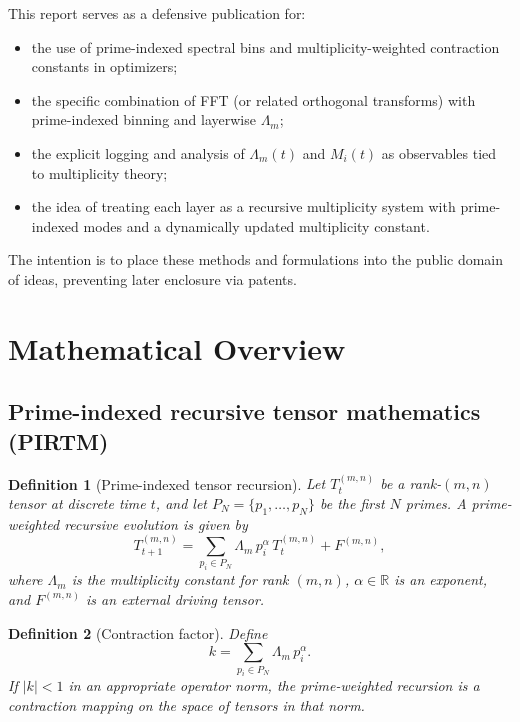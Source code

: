 \documentclass[11pt]{article}
\newtheorem{definition}{Definition}
\begin{document}
This report serves as a defensive publication for:
\begin{itemize}[leftmargin=*]
  \item the use of prime-indexed spectral bins and multiplicity-weighted contraction constants in optimizers;
  \item the specific combination of FFT (or related orthogonal transforms) with prime-indexed binning and layerwise $\Lambda_m$;
  \item the explicit logging and analysis of $\Lambda_m(t)$ and $M_i(t)$ as observables tied to multiplicity theory;
  \item the idea of treating each layer as a recursive multiplicity system with prime-indexed modes and a dynamically updated multiplicity constant.
\end{itemize}
The intention is to place these methods and formulations into the public domain of ideas, preventing later enclosure via patents.

\section{Mathematical Overview}

\subsection{Prime-indexed recursive tensor mathematics (PIRTM)}

\begin{definition}[Prime-indexed tensor recursion]
Let $T^{(m,n)}_t$ be a rank-$(m,n)$ tensor at discrete time $t$, and let $P_N = \{p_1,\dots,p_N\}$ be the first $N$ primes. A \emph{prime-weighted recursive evolution} is given by
\begin{equation}
  T^{(m,n)}_{t+1}
  =
  \sum_{p_i \in P_N} \Lambda_m \, p_i^{\alpha} \, T^{(m,n)}_t
  + F^{(m,n)},
  \label{eq:pirtm_base}
\end{equation}
where $\Lambda_m$ is the multiplicity constant for rank $(m,n)$, $\alpha \in \mathbb{R}$ is an exponent, and $F^{(m,n)}$ is an external driving tensor.
\end{definition}

\begin{definition}[Contraction factor]
Define
\begin{equation}
  k
  =
  \sum_{p_i \in P_N} \Lambda_m \, p_i^{\alpha}.
  \label{eq:k-def}
\end{equation}
If $|k| < 1$ in an appropriate operator norm, the prime-weighted recursion is a contraction mapping on the space of tensors in that norm.
\end{definition}
\end{document}
